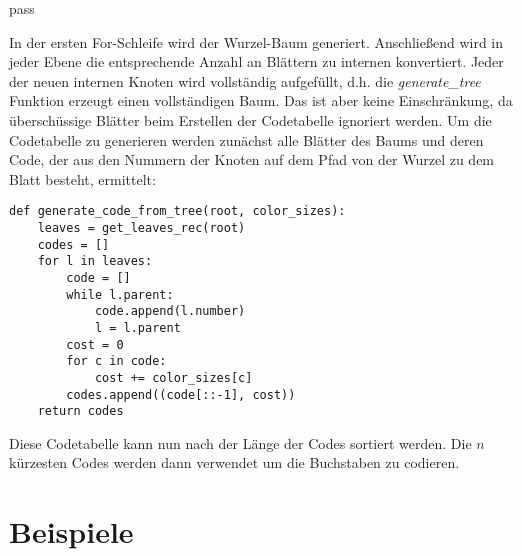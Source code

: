pass\documentclass[a4paper,10pt,ngerman]{scrartcl}
\begin{document}
    In der ersten For-Schleife wird der Wurzel-Baum generiert.
    Anschließend wird in jeder Ebene die entsprechende Anzahl an Blättern zu internen konvertiert.
    Jeder der neuen internen Knoten wird vollständig aufgefüllt, d.h. die \textit{generate\_tree} Funktion erzeugt einen vollständigen Baum.
    Das ist aber keine Einschränkung, da überschüssige Blätter beim Erstellen der Codetabelle ignoriert werden.
    Um die Codetabelle zu generieren werden zunächst alle Blätter des Baums und deren Code, der aus den Nummern der Knoten auf dem Pfad von der Wurzel zu dem Blatt besteht, ermittelt:
    \begin{verbatim}
def generate_code_from_tree(root, color_sizes):
    leaves = get_leaves_rec(root)
    codes = []
    for l in leaves:
        code = []
        while l.parent:
            code.append(l.number)
            l = l.parent
        cost = 0
        for c in code:
            cost += color_sizes[c]
        codes.append((code[::-1], cost))
    return codes
    \end{verbatim}
    Diese Codetabelle kann nun nach der Länge der Codes sortiert werden.
    Die $n$ kürzesten Codes werden dann verwendet um die Buchstaben zu codieren.


    \section{Beispiele}
\end{document}
